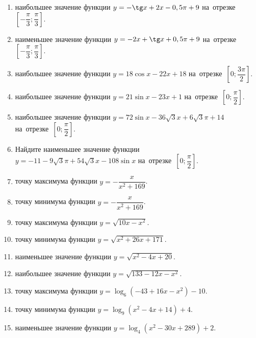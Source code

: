 \documentclass[a4paper,10pt]{article}
\begin{document}
\begin{enumerate}
\item {} наибольшее значение функции $y=-\tg x +2x-0,5\pi +9$ на~отрезке~$\left[-\dfrac{\pi}{3};\dfrac{\pi}{3}\right]$.

\item {} наименьшее значение функции $y=-2x +\tg x+0,5\pi+9$ на~отрезке~$\left[-\dfrac{\pi}{3};\dfrac{\pi}{3}\right]$.

\item {} наибольшее значение функции $y=18\cos x-22x+18$ на~отрезке~$\left[0;\dfrac{3\pi}{2}\right]$.

\item {} наибольшее значение функции $y=21\sin x-23x+1$ на~отрезке~$\left[0;\dfrac{\pi}{2}\right]$.

\item {} наибольшее значение функции $y=72\sin x-36\sqrt{3}x+6\sqrt{3}\pi +14$ на~отрезке~$\left[0;\dfrac{\pi}{2}\right]$.

\item Найдите наименьшее значение функции $y=-11-9\sqrt{3}\pi+54\sqrt{3}x-108\sin x$ на~отрезке~$\left[0;\dfrac{\pi}{2}\right]$.

\item {} точку максимума функции $y=-\dfrac{x}{ x^2 +169}$.

\item {} точку минимума функции $y=-\dfrac{x}{ x^2 +169}$.

\item {} точку максимума функции $y=\sqrt{10x-x^2}$.

\item {} точку минимума функции $y=\sqrt{x^2+26x+171}$.

\item {} наименьшее значение функции $y=\sqrt{x^2-4x+20}$.

\item {} наибольшее значение функции $y=\sqrt{133-12x-x^2}$.

\item {} точку максимума функции $y=\log_6\left(-43+16x-x^2\right)-10$.

\item {} точку минимума функции $y=\log_9\left(x^2-4x+14\right)+4$.

\item {} наименьшее значение функции $y=\log_4\left(x^2-30x+289\right)+2$.


\end{enumerate}
\end{document}
